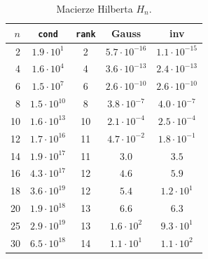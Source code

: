 \documentclass[11pt,a4paper]{article}
\begin{document}
\begin{table}[H]
\centering
\small
\caption{Macierze Hilberta $H_n$.}
\begin{tabular}{rcccc}
\toprule
$n$ & \texttt{cond} & \texttt{rank} & \textbf{Gauss} & \textbf{inv} \\
\midrule
2 & $1.9 \cdot 10^{1}$ & 2 & $5.7 \cdot 10^{-16}$ & $1.1 \cdot 10^{-15}$ \\
4 & $1.6 \cdot 10^{4}$ & 4 & $3.6 \cdot 10^{-13}$ & $2.4 \cdot 10^{-13}$ \\
6 & $1.5 \cdot 10^{7}$ & 6 & $2.6 \cdot 10^{-10}$ & $2.6 \cdot 10^{-10}$ \\
8 & $1.5 \cdot 10^{10}$ & 8 & $3.8 \cdot 10^{-7}$ & $4.0 \cdot 10^{-7}$ \\
10 & $1.6 \cdot 10^{13}$ & 10 & $2.1 \cdot 10^{-4}$ & $2.5 \cdot 10^{-4}$ \\
12 & $1.7 \cdot 10^{16}$ & 11 & $4.7 \cdot 10^{-2}$ & $1.8 \cdot 10^{-1}$ \\
14 & $1.9 \cdot 10^{17}$ & 11 & $3.0$ & $3.5$ \\
16 & $4.3 \cdot 10^{17}$ & 12 & $4.6$ & $5.9$ \\
18 & $3.6 \cdot 10^{19}$ & 12 & $5.4$ & $1.2 \cdot 10^{1}$ \\
20 & $1.9 \cdot 10^{18}$ & 13 & $6.6$ & $6.3$ \\
25 & $2.9 \cdot 10^{19}$ & 13 & $1.6 \cdot 10^{2}$ & $9.3 \cdot 10^{1}$ \\
30 & $6.5 \cdot 10^{18}$ & 14 & $1.1 \cdot 10^{1}$ & $1.1 \cdot 10^{2}$ \\
\bottomrule
\end{tabular}
\end{table}
\end{document}
